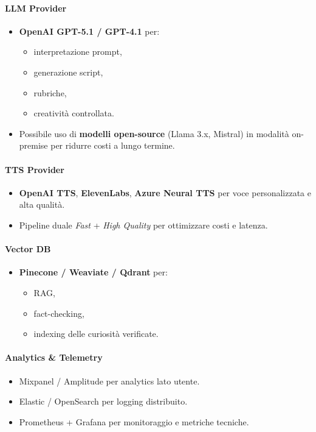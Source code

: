 \documentclass[11pt,a4paper]{article}
\begin{document}
\paragraph{LLM Provider}
\begin{itemize}
    \item \textbf{OpenAI GPT-5.1 / GPT-4.1} per:
    \begin{itemize}
        \item interpretazione prompt,
        \item generazione script,
        \item rubriche,
        \item creatività controllata.
    \end{itemize}
    \item Possibile uso di \textbf{modelli open-source} (Llama 3.x, Mistral) in modalità on-premise per ridurre costi a lungo termine.
\end{itemize}

\paragraph{TTS Provider}
\begin{itemize}
    \item \textbf{OpenAI TTS}, \textbf{ElevenLabs}, \textbf{Azure Neural TTS} per voce personalizzata e alta qualità.
    \item Pipeline duale \textit{Fast} + \textit{High Quality} per ottimizzare costi e latenza.
\end{itemize}

\paragraph{Vector DB}
\begin{itemize}
    \item \textbf{Pinecone / Weaviate / Qdrant} per:
    \begin{itemize}
        \item RAG,
        \item fact-checking,
        \item indexing delle curiosità verificate.
    \end{itemize}
\end{itemize}

\paragraph{Analytics \& Telemetry}
\begin{itemize}
    \item Mixpanel / Amplitude per analytics lato utente.
    \item Elastic / OpenSearch per logging distribuito.
    \item Prometheus + Grafana per monitoraggio e metriche tecniche.
\end{itemize}
\end{document}
